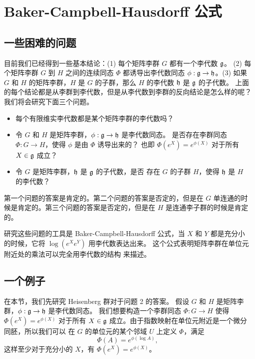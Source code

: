 \chapter{Baker-Campbell-Hausdorff \mbox{公式}}

\section{一些困难的问题}

目前我们已经得到一些基本结论：(1) 每个矩阵李群 $G$ 都有一个李代数 $\mathfrak{g}$。
(2) 每个矩阵李群 $G$ 到 $H$ 之间的连续同态 $\Phi$ 都诱导出李代数同态
$\phi:\mathfrak{g}\to\mathfrak{h}$。(3) 如果 $G$ 和 $H$ 的矩阵李群，$H$ 是 $G$
的子群，那么 $H$ 的李代数 $\mathfrak{h}$ 是 $\mathfrak{g}$ 的子代数。
上面的每个结论都是从李群到李代数，但是从李代数到李群的反向结论是怎么样的呢？
我们将会研究下面三个问题。
\begin{itemize}[noitemsep]
  \item 每个有限维实李代数都是某个矩阵李群的李代数吗？
  \item 令 $G$ 和 $H$ 是矩阵李群，$\phi:\mathfrak{g}\to\mathfrak{h}$ 是李代数同态。
  是否存在李群同态 $\Phi:G\to H$，使得 $\phi$ 是由 $\Phi$ 诱导出来的？
  也即 $\Phi(e^X)=e^{\phi(X)}$ 对于所有 $X\in\mathfrak{g}$ 成立？
  \item 令 $G$ 是矩阵李群，$\mathfrak{h}$ 是 $\mathfrak{g}$ 的子代数，是否
  存在 $G$ 的子群 $H$，使得 $\mathfrak{h}$ 是 $H$ 的李代数？
\end{itemize}

第一个问题的答案是肯定的。第二个问题的答案是否定的，但是在 $G$
单连通的时候是肯定的。第三个问题的答案是否定的，但是在 $H$
是连通李子群的时候是肯定的。

研究这些问题的工具是 Baker-Campbell-Hausdorff 公式，当 $X$
和 $Y$ 都是充分小的时候，它将 $\log(e^Xe^Y)$ 用李代数表达出来。
这个公式表明矩阵李群在单位元附近处的乘法可以完全用李代数的结构
来描述。

\section{一个例子}

在本节，我们先研究 Heisenberg 群对于问题 2 的答案。
假设 $G$ 和 $H$ 是矩阵李群，$\phi:\mathfrak{g}\to\mathfrak{h}$ 是李代数同态。
我们想要构造一个李群同态 $\Phi:G\to H$ 使得 $\Phi(e^X)=e^{\phi(X)}$ 对于所有
$X\in\mathfrak{g}$ 成立。由于指数映射在单位元附近是一个微分同胚，所以我们可以
在 $G$ 的单位元的某个邻域 $U$ 上定义 $\Phi$，满足
\[
  \Phi(A)=e^{\phi(\log A)},
\]
这样至少对于充分小的 $X$，有 $\Phi(e^X)=e^{\phi(X)}$。

